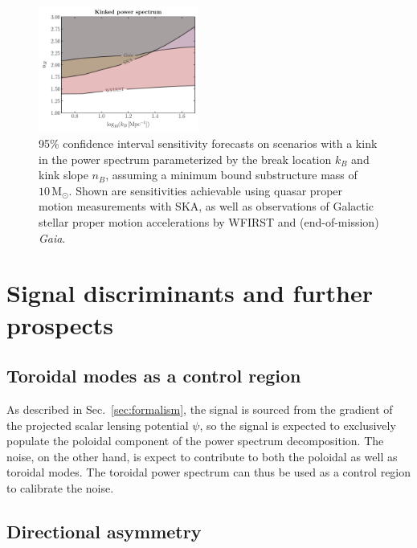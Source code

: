 \documentclass[prd,aps,10pt,nofootinbib,twocolumn,superscriptaddress,preprintnumbers,balancelastpage,longbibliography]{revtex4-1}
\newcommand{\Gaia}{\emph{Gaia}}
\begin{document}
\begin{figure}[!htbp]
  \centering
  \includegraphics[width=0.47\textwidth]{plots/kink_PS_sig}
  \caption{95\% confidence interval sensitivity forecasts on scenarios with a kink in the power spectrum parameterized by the break location $k_B$ and kink slope $n_B$, assuming a minimum bound substructure mass of $10\,\mathrm M_\odot$. Shown are sensitivities achievable using quasar proper motion measurements with SKA, as well as observations of Galactic stellar proper motion accelerations by WFIRST and (end-of-mission) \Gaia.}
  \label{fig:kink_ps}
\end{figure}

\section{Signal discriminants and further prospects}
\label{sec:handles}

\subsection{Toroidal modes as a control region}

As described in Sec.~\ref{sec:formalism}, the signal is sourced from the gradient of the projected scalar lensing potential $\psi$, so the signal is expected to exclusively populate the poloidal component of the power spectrum decomposition. The noise, on the other hand, is expect to contribute to both the poloidal as well as toroidal modes. The toroidal power spectrum can thus be used as a control region to calibrate the noise.

\subsection{Directional asymmetry}
\end{document}
